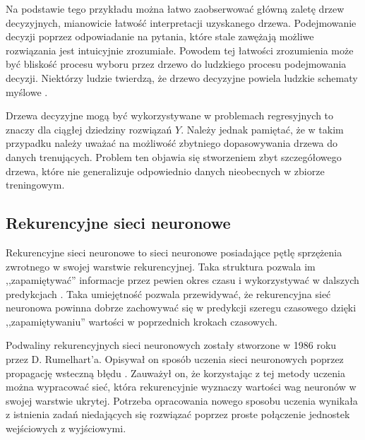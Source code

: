 \documentclass[10pt,a4paper]{article}
\begin{document}
Na podstawie tego przykładu można łatwo zaobserwować główną zaletę drzew decyzyjnych, mianowicie łatwość interpretacji uzyskanego drzewa. Podejmowanie decyzji poprzez odpowiadanie na pytania, które stale zawężają możliwe rozwiązania jest intuicyjnie zrozumiałe. Powodem tej łatwości zrozumienia może być bliskość procesu wyboru przez drzewo do ludzkiego procesu podejmowania decyzji. Niektórzy ludzie twierdzą, że drzewo decyzyjne powiela ludzkie schematy myślowe \cite{James2013}. 

Drzewa decyzyjne mogą być wykorzystywane w problemach regresyjnych to znaczy dla ciągłej dziedziny rozwiązań $Y$. Należy jednak pamiętać, że w takim przypadku  należy uważać na możliwość zbytniego dopasowywania drzewa do danych trenujących. Problem ten objawia się stworzeniem zbyt szczegółowego drzewa, które nie generalizuje odpowiednio danych nieobecnych w zbiorze treningowym.

\subsection{Rekurencyjne sieci neuronowe}
Rekurencyjne sieci neuronowe to sieci neuronowe posiadające pętlę sprzężenia zwrotnego w swojej warstwie rekurencyjnej. Taka struktura pozwala im ,,zapamiętywać'' informacje przez pewien okres czasu i wykorzystywać w dalszych predykcjach \cite{reviewOfANN2018}. Taka umiejętność pozwala przewidywać, że rekurencyjna sieć neuronowa powinna dobrze zachowywać się w predykcji szeregu czasowego dzięki ,,zapamiętywaniu'' wartości w poprzednich krokach czasowych. 

Podwaliny rekurencyjnych sieci neuronowych zostały stworzone w 1986 roku przez D. Rumelhart'a. Opisywał on sposób uczenia sieci neuronowych poprzez propagację wsteczną błędu \cite{rumelhart1986learning}. Zauważył on, że korzystając z tej metody uczenia można wypracować sieć, która rekurencyjnie wyznaczy wartości wag neuronów w swojej warstwie ukrytej. Potrzeba opracowania nowego sposobu uczenia wynikała z istnienia zadań niedających się rozwiązać poprzez proste połączenie jednostek wejściowych z wyjściowymi.
\end{document}
